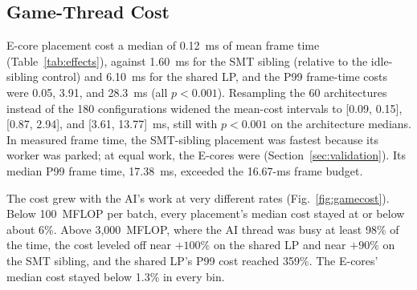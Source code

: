 \documentclass[conference]{IEEEtran}
\begin{document}
\subsection{Game-Thread Cost}
E-core placement cost a median of 0.12~ms of mean frame time (Table~\ref{tab:effects}), against 1.60~ms for the SMT sibling (relative to the idle-sibling control) and 6.10~ms for the shared LP, and the P99 frame-time costs were 0.05, 3.91, and 28.3~ms (all $p<0.001$). Resampling the 60 architectures instead of the 180 configurations widened the mean-cost intervals to [0.09, 0.15], [0.87, 2.94], and [3.61, 13.77]~ms, still with $p<0.001$ on the architecture medians. In measured frame time, the SMT-sibling placement was fastest because its worker was parked; at equal work, the E-cores were (Section~\ref{sec:validation}). Its median P99 frame time, 17.38~ms, exceeded the 16.67-ms frame budget.

The cost grew with the AI's work at very different rates (Fig.~\ref{fig:gamecost}). Below 100~MFLOP per batch, every placement's median cost stayed at or below about 6\%. Above 3,000~MFLOP, where the AI thread was busy at least 98\% of the time, the cost leveled off near $+100\%$ on the shared LP and near $+90\%$ on the SMT sibling, and the shared LP's P99 cost reached 359\%. The E-cores' median cost stayed below 1.3\% in every bin.
\end{document}
